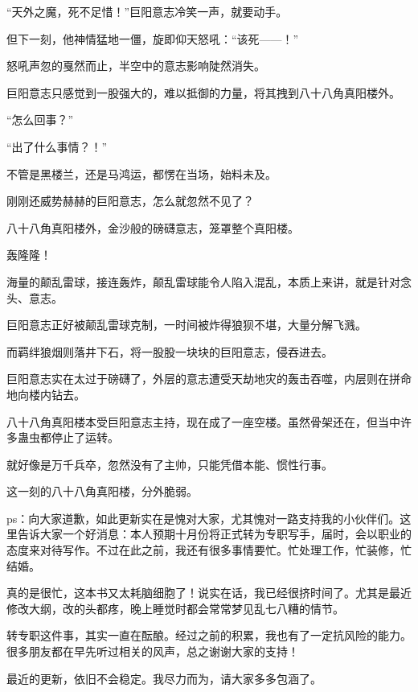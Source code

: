 \begin{this_body}
“天外之魔，死不足惜！”巨阳意志冷笑一声，就要动手。

但下一刻，他神情猛地一僵，旋即仰天怒吼：“该死——！”

怒吼声忽的戛然而止，半空中的意志影响陡然消失。

巨阳意志只感觉到一股强大的，难以抵御的力量，将其拽到八十八角真阳楼外。

“怎么回事？”

“出了什么事情？！”

不管是黑楼兰，还是马鸿运，都愣在当场，始料未及。

刚刚还威势赫赫的巨阳意志，怎么就忽然不见了？

八十八角真阳楼外，金沙般的磅礴意志，笼罩整个真阳楼。

轰隆隆！

海量的颠乱雷球，接连轰炸，颠乱雷球能令人陷入混乱，本质上来讲，就是针对念头、意志。

巨阳意志正好被颠乱雷球克制，一时间被炸得狼狈不堪，大量分解飞溅。

而羁绊狼烟则落井下石，将一股股一块块的巨阳意志，侵吞进去。

巨阳意志实在太过于磅礴了，外层的意志遭受天劫地灾的轰击吞噬，内层则在拼命地向楼内钻去。

八十八角真阳楼本受巨阳意志主持，现在成了一座空楼。虽然骨架还在，但当中许多蛊虫都停止了运转。

就好像是万千兵卒，忽然没有了主帅，只能凭借本能、惯性行事。

这一刻的八十八角真阳楼，分外脆弱。

ps：向大家道歉，如此更新实在是愧对大家，尤其愧对一路支持我的小伙伴们。这里告诉大家一个好消息：本人预期十月份将正式转为专职写手，届时，会以职业的态度来对待写作。不过在此之前，我还有很多事情要忙。忙处理工作，忙装修，忙结婚。

真的是很忙，这本书又太耗脑细胞了！说实在话，我已经很挤时间了。尤其是最近修改大纲，改的头都疼，晚上睡觉时都会常常梦见乱七八糟的情节。

转专职这件事，其实一直在酝酿。经过之前的积累，我也有了一定抗风险的能力。很多朋友都在早先听过相关的风声，总之谢谢大家的支持！

最近的更新，依旧不会稳定。我尽力而为，请大家多多包涵了。

\end{this_body}

